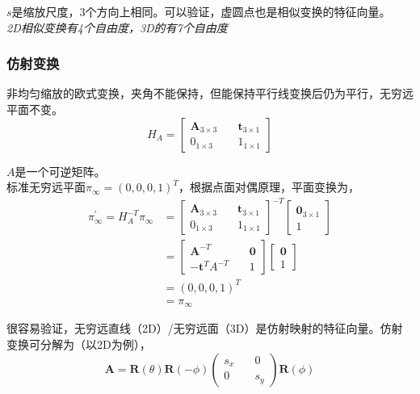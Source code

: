 \documentclass[hpyerref,UTF8,a4paper,titlepage,12pt,oneside]{ctexbook}
\theoremstyle{definition}
\begin{document}
		$s$是缩放尺度，3个方向上相同。可以验证，虚圆点也是相似变换的特征向量。\\

		\textit{2D相似变换有4个自由度，3D的有7个自由度}
	
	\subsubsection{仿射变换}
		非均匀缩放的欧式变换，夹角不能保持，但能保持平行线变换后仍为平行，无穷远平面不变。
		$$
			H_A = \begin{bmatrix}
				\mathbf{A}_{3\times 3}\quad& \mathbf{t}_{3\times 1}\\
				0_{1\times 3} \quad& 1_{1\times 1}
			\end{bmatrix}
		$$

		$A$是一个可逆矩阵。\\

		标准无穷远平面$\pi_{\infty} = (0,0,0,1)^T$，根据点面对偶原理，平面变换为，
		\begin{align*}
			\pi_{\infty}^{\prime} = H_A^{-T}\pi_{\infty} 
			&=
			\begin{bmatrix}
				\mathbf{A}_{3\times 3}\quad& \mathbf{t}_{3\times 1}\\
				0_{1\times 3} \quad& 1_{1\times 1}
			\end{bmatrix}^{-T}
			\begin{bmatrix}
				\mathbf{0}_{3\times 1}\\
				1
			\end{bmatrix}\\
			&=
			\begin{bmatrix}
				\mathbf{A}^{-T}\quad& \mathbf{0}\\
				-\mathbf{t}^TA^{-T} \quad& 1
			\end{bmatrix}
			\begin{bmatrix}
				\mathbf{0}\\
				1
			\end{bmatrix}\\
			&= (0,0,0,1)^T\\
			&=\pi_{\infty} 
		\end{align*}

		很容易验证，无穷远直线（2D）/无穷远面（3D）是仿射映射的特征向量。仿射变换可分解为（以2D为例），
		$$
			\mathbf{A} = \mathbf{R}(\theta)\mathbf{R}(-\phi)
			\begin{pmatrix}
				s_x \quad &0\\
				0 \quad & s_y
			\end{pmatrix}
			\mathbf{R}(\phi)
		$$
\end{document}
